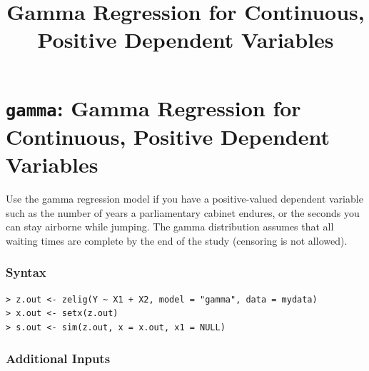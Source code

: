 \documentclass{article}
\title{Gamma Regression for Continuous, Positive Dependent Variables}
\begin{document}
\nobibliography*


\section{{\tt gamma}: Gamma Regression for Continuous, Positive Dependent Variables}\label{gamma}

Use the gamma regression model if you have a positive-valued dependent
variable such as the number of years a parliamentary cabinet endures,
or the seconds you can stay airborne while jumping.  The gamma
distribution assumes that all waiting times are complete by the end
of the study (censoring is not allowed).

\subsubsection{Syntax}

\begin{verbatim}
> z.out <- zelig(Y ~ X1 + X2, model = "gamma", data = mydata)
> x.out <- setx(z.out)
> s.out <- sim(z.out, x = x.out, x1 = NULL)
\end{verbatim}

\subsubsection{Additional Inputs} 
\end{document}
